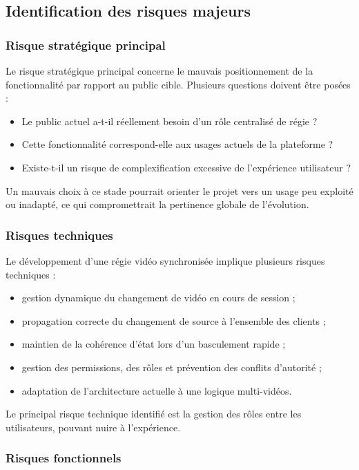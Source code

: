 \documentclass[12pt,a4paper]{report}
\begin{document}
\subsection{Identification des risques majeurs}

\subsubsection{Risque stratégique principal}

Le risque stratégique principal concerne le mauvais positionnement de la fonctionnalité par
rapport au public cible.
Plusieurs questions doivent être posées :
\begin{itemize}
  \item Le public actuel a-t-il réellement besoin d’un rôle centralisé de régie ?
  \item Cette fonctionnalité correspond-elle aux usages actuels de la plateforme ?
  \item Existe-t-il un risque de complexification excessive de l’expérience utilisateur ?
\end{itemize}
Un mauvais choix à ce stade pourrait orienter le projet vers un usage peu exploité ou inadapté, ce
qui compromettrait la pertinence globale de l’évolution.

\subsubsection{Risques techniques}

Le développement d’une régie vidéo synchronisée implique plusieurs risques techniques :
\begin{itemize}
  \item gestion dynamique du changement de vidéo en cours de session ;
  \item propagation correcte du changement de source à l’ensemble des clients ;
  \item maintien de la cohérence d’état lors d’un basculement rapide ;
  \item gestion des permissions, des rôles et prévention des conflits d’autorité ;
  \item adaptation de l’architecture actuelle à une logique multi-vidéos.
\end{itemize}
Le principal risque technique identifié est la gestion des rôles entre les utilisateurs, pouvant nuire
à l’expérience.

\subsubsection{Risques fonctionnels}
\end{document}
